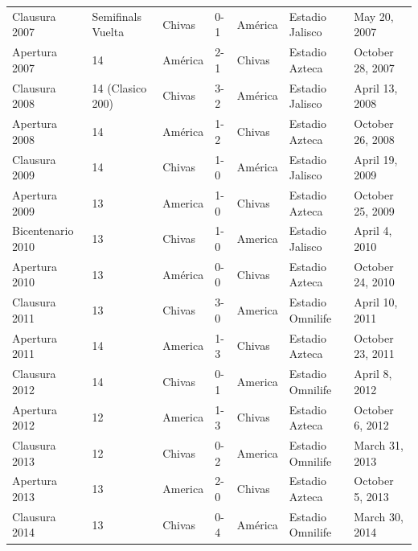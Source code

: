 \documentclass{article}
\begin{document}
\begin{tabular}{lllllll}
Clausura 2007 & Semifinals Vuelta & Chivas & 0-1 & América & Estadio Jalisco & May 20, 2007 \\
Apertura 2007 & 14 & América & 2-1 & Chivas & Estadio Azteca & October 28, 2007 \\
Clausura 2008 & 14 (Clasico 200) & Chivas & 3-2 & América & Estadio Jalisco & April 13, 2008 \\
Apertura 2008 & 14 & América & 1-2 & Chivas & Estadio Azteca & October 26, 2008 \\
Clausura 2009 & 14 & Chivas & 1-0 & América & Estadio Jalisco & April 19, 2009 \\
Apertura 2009 & 13 & America & 1-0 & Chivas & Estadio Azteca & October 25, 2009 \\
Bicentenario 2010 & 13 & Chivas & 1-0 & America & Estadio Jalisco & April 4, 2010 \\
Apertura 2010 & 13 & América & 0-0 & Chivas & Estadio Azteca & October 24, 2010 \\
Clausura 2011 & 13 & Chivas & 3-0 & America & Estadio Omnilife & April 10, 2011 \\
Apertura 2011 & 14 & America & 1-3 & Chivas & Estadio Azteca & October 23, 2011 \\
Clausura 2012 & 14 & Chivas & 0-1 & America & Estadio Omnilife & April 8, 2012 \\
Apertura 2012 & 12 & America & 1-3 & Chivas & Estadio Azteca & October 6, 2012 \\
Clausura 2013 & 12 & Chivas & 0-2 & America & Estadio Omnilife & March 31, 2013 \\
Apertura 2013 & 13 & America & 2-0 & Chivas & Estadio Azteca & October 5, 2013 \\
Clausura 2014 & 13 & Chivas & 0-4 & América & Estadio Omnilife & March 30, 2014 \\
\bottomrule
\end{tabular}
\end{document}
